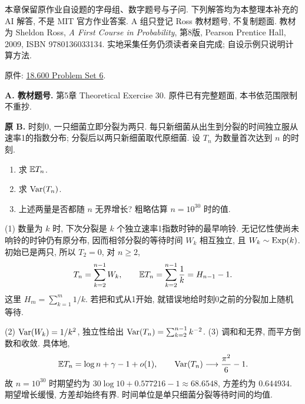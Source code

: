 \label{chap:assignments-late}
本章保留原作业自设题的字母组、数字题号与子问. 下列解答均为本整理本补充的 AI 解答, 不是 MIT 官方作业答案. A 组只登记 Ross 教材题号, 不复制题面. 教材为 Sheldon Ross, \textit{A First Course in Probability}, 第8版, Pearson Prentice Hall, 2009, ISBN 9780136033134. 实地采集任务仍须读者亲自完成; 自设示例只说明计算方法.

原件: \href{https://ocw.mit.edu/courses/18-600-probability-and-random-variables-fall-2019/resources/mit18_600f19_pset6/}{18.600 Problem Set 6}.
\par\noindent\textbf{A. 教材题号.}\label{part:P6.A.1} 第5章 Theoretical Exercise 30. 原件已有完整题面, 本书依范围限制不重抄.

\begin{exercise}\label{ex:P6.B}
\textbf{原 B.} 时刻0, 一只细菌立即分裂为两只. 每只新细菌从出生到分裂的时间独立服从速率1的指数分布; 分裂后以两只新细菌取代原细菌. 设 $T_n$ 为数量首次达到 $n$ 的时刻.
\begin{enumerate}[label=\arabic*.]
\item\label{part:P6.B.1} 求 $\mathbb E T_n$.
\item\label{part:P6.B.2} 求 $\operatorname{Var}(T_n)$.
\item\label{part:P6.B.3} 上述两量是否都随 $n$ 无界增长? 粗略估算 $n=10^{30}$ 时的值.
\end{enumerate}
\end{exercise}
\begin{solution}\label{sol:P6.B}
(1) 数量为 $k$ 时, 下次分裂是 $k$ 个独立速率1指数时钟的最早响铃. 无记忆性使尚未响铃的时钟仍有原分布, 因而相邻分裂的等待时间 $W_k$ 相互独立, 且 $W_k\sim\operatorname{Exp}(k)$. 初始已是两只, 所以 $T_2=0$, 对 $n\ge2$,
\[
 T_n=\sum_{k=2}^{n-1}W_k,\qquad
 \mathbb E T_n=\sum_{k=2}^{n-1}\frac1k=H_{n-1}-1.
\]
这里 $H_m=\sum_{k=1}^m1/k$. 若把和式从1开始, 就错误地给时刻0之前的分裂加上随机等待.

(2) $\operatorname{Var}(W_k)=1/k^2$, 独立性给出 $\operatorname{Var}(T_n)=\sum_{k=2}^{n-1}k^{-2}$. (3) 调和和无界, 而平方倒数和收敛. 具体地,
\[
 \mathbb E T_n=\log n+\gamma-1+o(1),\qquad
 \operatorname{Var}(T_n)\longrightarrow\frac{\pi^2}{6}-1.
\]
故 $n=10^{30}$ 时期望约为 $30\log10+0.577216-1\approx68.6548$, 方差约为 $0.644934$. 期望增长缓慢, 方差却始终有界. 时间单位是单只细菌分裂等待时间的均值.
\end{solution}

